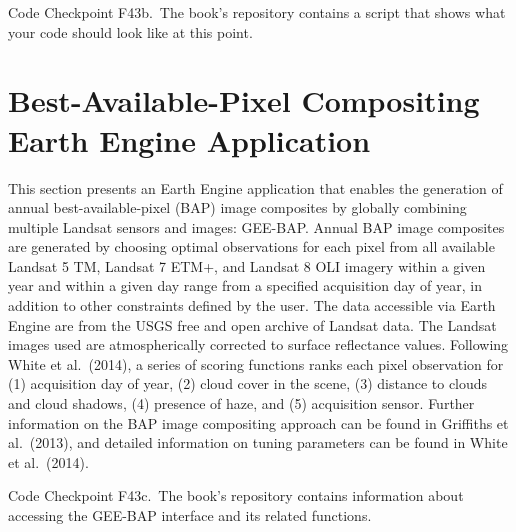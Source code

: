 \documentclass[
  letterpaper,
  DIV=11,
  numbers=noendperiod]{scrreprt}
\begin{document}
\begin{tcolorbox}[enhanced jigsaw, left=2mm, breakable, rightrule=.15mm, opacityback=0, colframe=quarto-callout-note-color-frame, colbacktitle=quarto-callout-note-color!10!white, arc=.35mm, opacitybacktitle=0.6, toptitle=1mm, colback=white, leftrule=.75mm, title=\textcolor{quarto-callout-note-color}{\faInfo}\hspace{0.5em}{Note}, toprule=.15mm, bottomtitle=1mm, titlerule=0mm, bottomrule=.15mm, coltitle=black]

Code Checkpoint F43b.~The book's repository contains a script that shows
what your code should look like at this point.

\end{tcolorbox}

\hypertarget{best-available-pixel-compositing-earth-engine-application}{%
\section{Best-Available-Pixel Compositing Earth Engine
Application}\label{best-available-pixel-compositing-earth-engine-application}}

This section presents an Earth Engine application that enables the
generation of annual best-available-pixel (BAP) image composites by
globally combining multiple Landsat sensors and images: GEE-BAP. Annual
BAP image composites are generated by choosing optimal observations for
each pixel from all available Landsat 5 TM, Landsat 7 ETM+, and Landsat
8 OLI imagery within a given year and within a given day range from a
specified acquisition day of year, in addition to other constraints
defined by the user. The data accessible via Earth Engine are from the
USGS free and open archive of Landsat data. The Landsat images used are
atmospherically corrected to surface reflectance values. Following White
et al.~(2014), a series of scoring functions ranks each pixel
observation for (1) acquisition day of year, (2) cloud cover in the
scene, (3) distance to clouds and cloud shadows, (4) presence of haze,
and (5) acquisition sensor. Further information on the BAP image
compositing approach can be found in Griffiths et al.~(2013), and
detailed information on tuning parameters can be found in White et
al.~(2014).

\begin{tcolorbox}[enhanced jigsaw, left=2mm, breakable, rightrule=.15mm, opacityback=0, colframe=quarto-callout-note-color-frame, colbacktitle=quarto-callout-note-color!10!white, arc=.35mm, opacitybacktitle=0.6, toptitle=1mm, colback=white, leftrule=.75mm, title=\textcolor{quarto-callout-note-color}{\faInfo}\hspace{0.5em}{Note}, toprule=.15mm, bottomtitle=1mm, titlerule=0mm, bottomrule=.15mm, coltitle=black]

Code Checkpoint F43c.~The book's repository contains information about
accessing the GEE-BAP interface and its related functions.

\end{tcolorbox}
\end{document}
